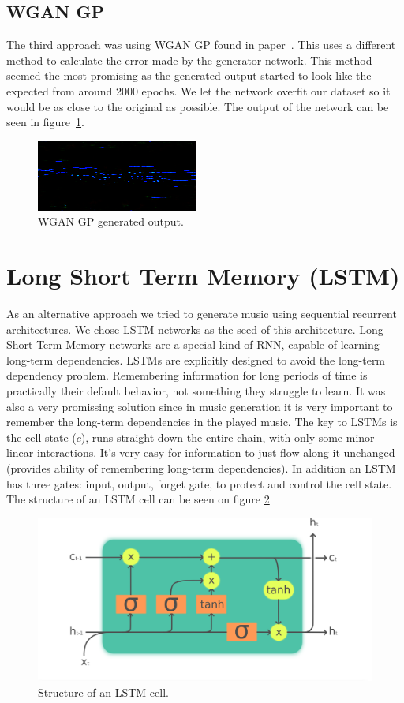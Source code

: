 \documentclass{article}
\begin{document}
\subsection{WGAN GP}
The third approach was using WGAN GP found in paper~\cite{wgangp}. This uses a different method to calculate the error made by the generator network. This method seemed the most promising as the generated output started to look like the expected from around 2000 epochs. We let the network overfit our dataset so it would be as close to the original as possible. The output of the network can be seen in figure~\ref{fig:wgangp}.
\begin{figure}[!htb]
	\centering
	\includegraphics[width=0.7\linewidth]{wgangp.png}
	\caption{WGAN GP generated output.}
	\label{fig:wgangp}
\end{figure}

\section{Long Short Term Memory (LSTM)}

As an alternative approach we tried to generate music using sequential recurrent architectures. We chose LSTM networks as the seed of this architecture. Long Short Term Memory networks are a special kind of RNN, capable of learning long-term dependencies. 
LSTMs are explicitly designed to avoid the long-term dependency problem. Remembering information for long periods of time is practically their default behavior, not something they struggle to learn. It was also a very promissing solution since in music generation it is very important to remember the long-term dependencies in the played music. The key to LSTMs is the cell state ($c$), runs straight down the entire chain, with only some minor linear interactions. It’s very easy for information to just flow along it unchanged (provides ability of remembering long-term dependencies). In addition an LSTM has three gates: input, output, forget gate, to protect and control the cell state. The structure of an LSTM cell can be seen on figure \ref{fig:lstmcell}

\begin{figure}[!htb]
	\centering
	\includegraphics[width=0.7\linewidth]{LSTMcell.png}
	\caption{Structure of an LSTM cell.}
	\label{fig:lstmcell}
\end{figure}
\end{document}
